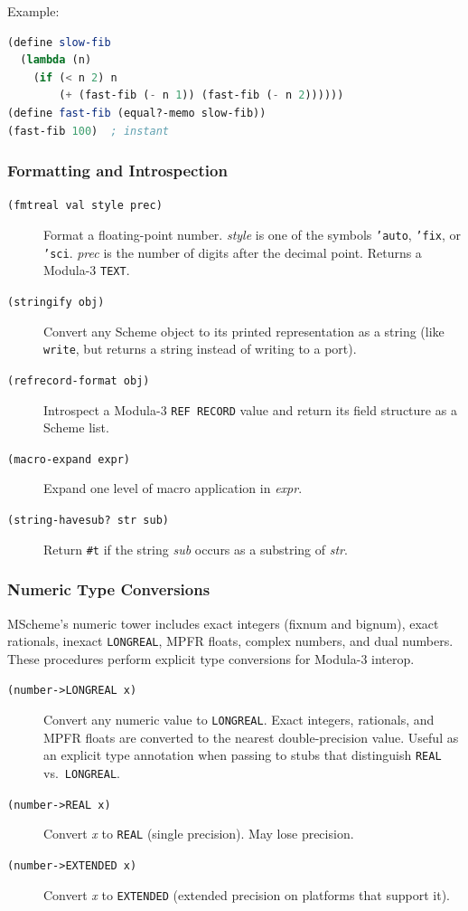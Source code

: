 \documentclass[12pt]{report}
\begin{document}
\noindent Example:
\begin{lstlisting}[language=Scheme]
(define slow-fib
  (lambda (n)
    (if (< n 2) n
        (+ (fast-fib (- n 1)) (fast-fib (- n 2))))))
(define fast-fib (equal?-memo slow-fib))
(fast-fib 100)  ; instant
\end{lstlisting}

\subsubsection{Formatting and Introspection}

\nopagebreak[4]
\begin{description}
\item[{\tt (fmtreal val style prec)}]
  Format a floating-point number.  {\it style\/} is one of the symbols
  {\tt 'auto}, {\tt 'fix}, or {\tt 'sci}.  {\it prec\/} is the number of
  digits after the decimal point.  Returns a Modula-3 {\tt TEXT}.
\item[{\tt (stringify obj)}]
  Convert any Scheme object to its printed representation as a
  string (like {\tt write}, but returns a string instead of writing
  to a port).
\item[{\tt (refrecord-format obj)}]
  Introspect a Modula-3 {\tt REF RECORD} value and return its
  field structure as a Scheme list.
\item[{\tt (macro-expand expr)}]
  Expand one level of macro application in {\it expr}.
\item[{\tt (string-havesub? str sub)}]
  Return {\tt \#t} if the string {\it sub\/} occurs as a substring
  of {\it str}.
\end{description}

\subsubsection{Numeric Type Conversions}

MScheme's numeric tower includes exact integers (fixnum and bignum),
exact rationals, inexact {\tt LONGREAL}, MPFR floats, complex numbers,
and dual numbers.
These procedures perform explicit type conversions for Modula-3 interop.

\nopagebreak[4]
\begin{description}
\item[{\tt (number->LONGREAL x)}]
  Convert any numeric value to {\tt LONGREAL}.  Exact integers,
  rationals, and MPFR floats are converted to the nearest
  double-precision value.  Useful as an explicit type annotation
  when passing to stubs that distinguish {\tt REAL} vs.\ {\tt LONGREAL}.
\item[{\tt (number->REAL x)}]
  Convert {\it x\/} to {\tt REAL} (single precision).
  May lose precision.
\item[{\tt (number->EXTENDED x)}]
  Convert {\it x\/} to {\tt EXTENDED} (extended precision on
  platforms that support it).
\end{description}
\end{document}
